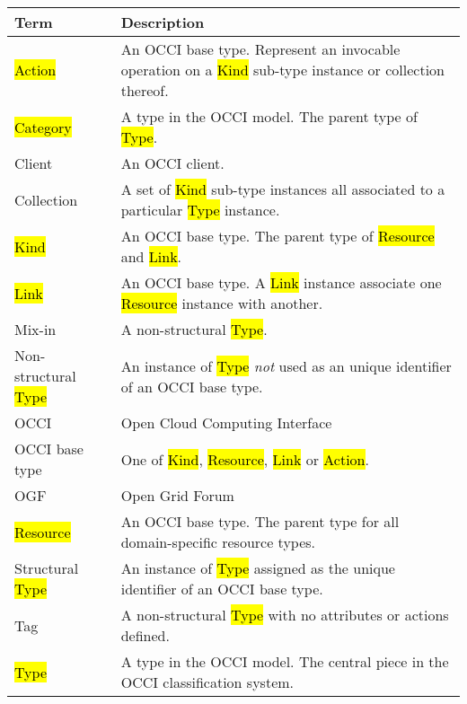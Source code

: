 \begin{tabular}{l|p{11cm}}
Term & Description \\
\hline
\hl{Action} & An OCCI base type. Represent an invocable operation on a \hl{Kind} sub-type instance or collection thereof. \\
\hl{Category} & A type in the OCCI model. The parent type of \hl{Type}. \\
Client & An OCCI client.\\
Collection & A set of \hl{Kind} sub-type instances all associated to a particular \hl{Type} instance. \\
\hl{Kind} & An OCCI base type. The parent type of \hl{Resource} and \hl{Link}. \\
\hl{Link} & An OCCI base type. A \hl{Link} instance associate one \hl{Resource} instance with another. \\
Mix-in & A non-structural \hl{Type}. \\
Non-structural \hl{Type} & An instance of \hl{Type} {\em not} used as an unique identifier of an OCCI base type. \\
OCCI & Open Cloud Computing Interface \\
OCCI base type & One of \hl{Kind}, \hl{Resource}, \hl{Link} or \hl{Action}. \\
OGF & Open Grid Forum \\
\hl{Resource} & An OCCI base type. The parent type for all domain-specific resource types. \\
Structural \hl{Type} & An instance of \hl{Type} assigned as the unique identifier of an OCCI base type. \\
Tag & A non-structural \hl{Type} with no attributes or actions defined. \\
\hl{Type} & A type in the OCCI model. The central piece in the OCCI classification system. \\
\end{tabular}
